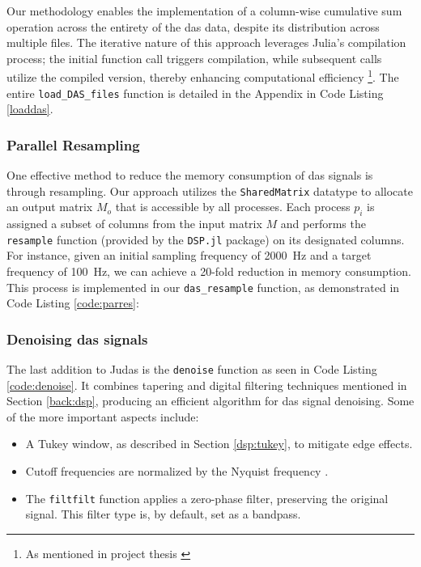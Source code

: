 Our methodology enables the implementation of a column-wise cumulative sum operation across the entirety of the \acrshort{das} data, despite its distribution across multiple files. The iterative nature of this approach leverages Julia's compilation process; the initial function call triggers compilation, while subsequent calls utilize the compiled version, thereby enhancing computational efficiency \footnote{As mentioned in project thesis  \cite{projthesis}}. The entire \lstinline{load_DAS_files} function is detailed in the Appendix in Code Listing \ref{loaddas}.

\subsubsection{Parallel Resampling}

One effective method to reduce the memory consumption of \acrshort{das} signals is through resampling. Our approach utilizes the \texttt{SharedMatrix} datatype to allocate an output matrix $M_o$ that is accessible by all processes. Each process $p_i$ is assigned a subset of columns from the input matrix $M$ and performs the \texttt{resample} function (provided by the \texttt{DSP.jl} package) on its designated columns. For instance, given an initial sampling frequency of \qty{2000}{\hertz} and a target frequency of \qty{100}{\hertz}, we can achieve a 20-fold reduction in memory consumption. This process is implemented in our \texttt{das\_resample} function, as demonstrated in Code Listing \ref{code:parres}:



\clearpage
\subsubsection{Denoising \acrshort{das} signals}



The last addition to Judas is the \texttt{denoise} function as seen in Code Listing \ref{code:denoise}. It combines tapering and digital filtering techniques mentioned in Section \ref{back:dsp}, producing an efficient algorithm for \acrshort{das} signal denoising. Some of the more important aspects include: 

\begin{itemize}
    \item A Tukey window, as described in Section \ref{dsp:tukey}, to mitigate edge effects.
    \item Cutoff frequencies are normalized by the Nyquist frequency \cite{schmogrow2012nyquist}.
    \item The \texttt{filtfilt} function applies a zero-phase filter, preserving the original signal. This filter type is, by default, set as a bandpass. 
\end{itemize}

